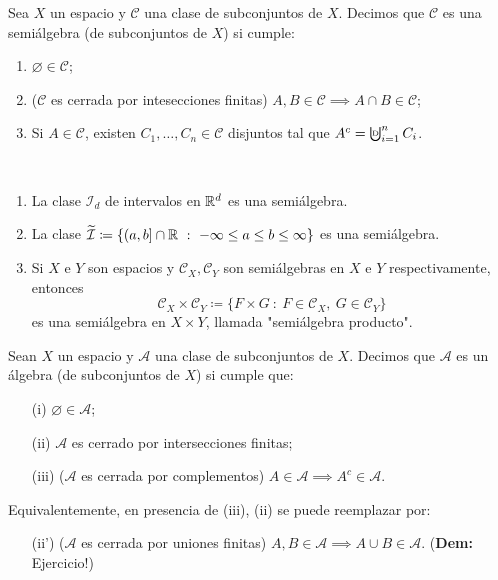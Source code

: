 \medskip
\begin{definition}[semiálgebra]
	Sea $X$ un espacio y $\mathscr{C}$ una clase de subconjuntos de $X$. Decimos que $\mathscr{C}$ es una semiálgebra (de subconjuntos de $X$) si cumple:
	\begin{enumerate}
		\item $\varnothing \in \mathscr{C}$;

		\item ($\mathscr{C}$ es cerrada por intesecciones finitas) $A,B\in\mathscr{C} \implies A \cap B \in \mathscr{C}$;
		
		\item Si $A \in \mathscr{C}$, existen $C_1,\dots,C_n \in \mathscr{C}$ disjuntos tal que $A^c = \textbigcupd_{i=1}^{n} C_i$.
	\end{enumerate}
\end{definition}
\smallskip	
\begin{eg}~
	\begin{enumerate}
		\item La clase $\mathcal{I}_d$ de intervalos en $\mathbb{R}^d$ es una semiálgebra.

		\item La clase $\widetilde{\mathcal{I}} \coloneq \{ (a,b] \cap \mathbb{R} \ : \ -\infty \leq a \leq b \leq \infty \}$ es una semiálgebra.

		\item Si $X$ e $Y$ son espacios y $\mathscr{C}_X, \mathscr{C}_Y$ son semiálgebras en $X$ e $Y$ respectivamente, entonces
		\[ \mathscr{C}_X \times \mathscr{C}_Y \coloneq \{ F \times G \ : \ F \in \mathscr{C}_X,\ G \in \mathscr{C}_Y \} \]
		es una semiálgebra en $X \times Y$, llamada "semiálgebra producto".
	\end{enumerate}
\end{eg}

\begin{definition}[álgebra]
	Sean $X$ un espacio y $\mathscr{A}$ una clase de subconjuntos de $X$. Decimos que $\mathscr{A}$ es un álgebra (de subconjuntos de $X$) si cumple que:
	\begin{enumerate}
		\item[(i)] $\varnothing \in \mathscr{A}$;
		
		\item[(ii)] $\mathscr{A}$ es cerrado por intersecciones finitas;

		\item[(iii)] ($\mathscr{A}$ es cerrada por complementos) $A \in \mathscr{A} \implies A^c \in \mathscr{A}$. 
	\end{enumerate}	
		\noindent Equivalentemente, en presencia de (iii), (ii) se puede reemplazar por:	
	\begin{enumerate}
		\item[(ii')] ($\mathscr{A}$ es cerrada por uniones finitas) $A,B\in \mathscr{A} \implies A \cup B \in \mathscr{A}$. (\textbf{Dem:} Ejercicio!)
	\end{enumerate}
\end{definition}

